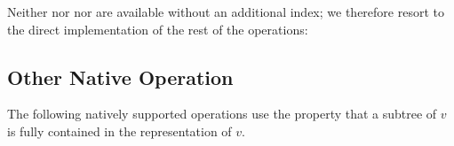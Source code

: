 \begin{algorithmic}
	\State {}
\EndFunction
\end{algorithmic}

Neither \degree{} nor \childRank{} nor \childSelect{} are available without an additional index; we therefore resort to the direct implementation of the rest of the \childAny{} operations:

\begin{algorithmic}
	\State {}
\EndFunction
\end{algorithmic}

\begin{algorithmic}
	\State {}
\EndFunction
\end{algorithmic}

\begin{algorithmic}
	\State {}
\EndFunction
\end{algorithmic}

\begin{algorithmic}
	\State {}
\EndFunction
\end{algorithmic}

\subsection{Other Native Operation}\label{ss:bp-other}

The following natively supported operations use the property that a subtree of $v$ is fully contained in the representation of $v$.

\begin{algorithmic}
	\State {}
\EndFunction
\end{algorithmic}

\begin{algorithmic}
	\State {}
\EndFunction
\end{algorithmic}

\begin{algorithmic}
	\State {}
\EndFunction
\end{algorithmic}

